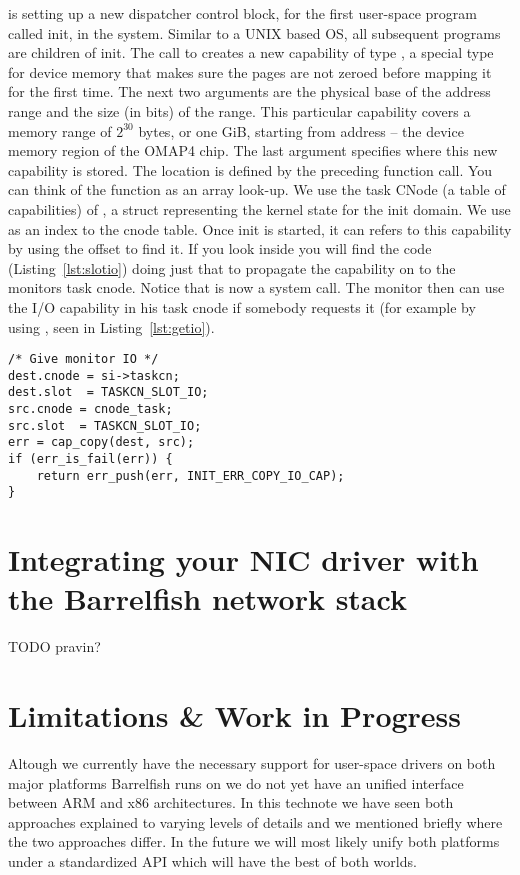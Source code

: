 \documentclass[a4paper,11pt,twoside]{report}
\begin{document}
 is setting up a new dispatcher control block, for
the first user-space program called init, in the system. Similar to a UNIX
based OS, all subsequent programs are children of init. The call to
 creates a new capability of type
, a special type for device memory that makes sure
the pages are not zeroed before mapping it for the first time. The next two
arguments are the physical base of the address range and the size (in bits) of
the range. This particular capability covers a memory range of $2^{30}$ bytes,
or one GiB, starting from address  -- the device memory
region of the OMAP4 chip. The last argument specifies where this new
capability is stored. The location is defined by the preceding
 function call. You can think of the
 function as an array look-up. We use the task
CNode (a table of capabilities) of , a struct
representing the kernel state for the init domain. We use
  as an index to the cnode table. Once init is
started, it can refers to this capability by using the 
offset to find it. If you look inside  you will
find the code (Listing~\ref{lst:slotio}) doing just that to propagate the capability on to the monitors task cnode. Notice that  is
now a system call. The monitor then can use the I/O capability in
his task cnode if somebody requests it (for example by using ,
seen in Listing~\ref{lst:getio}).

\begin{lstlisting}[caption={Copy of the I/O capability from
    \varname{src} to \varname{dest}.}, label={lst:slotio}]
/* Give monitor IO */
dest.cnode = si->taskcn;
dest.slot  = TASKCN_SLOT_IO;
src.cnode = cnode_task;
src.slot  = TASKCN_SLOT_IO;
err = cap_copy(dest, src);
if (err_is_fail(err)) {
    return err_push(err, INIT_ERR_COPY_IO_CAP);
}
\end{lstlisting}

\chapter{Integrating your NIC driver with the Barrelfish network stack}
\label{chap:network}

TODO pravin?


\chapter{Limitations \& Work in Progress}

Altough we currently have the necessary support for user-space drivers
on both major platforms Barrelfish runs on we do not yet have an
unified interface between ARM and x86 architectures. In this technote
we have seen both approaches explained to varying levels of details and
we mentioned briefly where the two approaches differ. In the future we will
most likely unify both platforms under a standardized API which will have
the best of both worlds.
\end{document}

